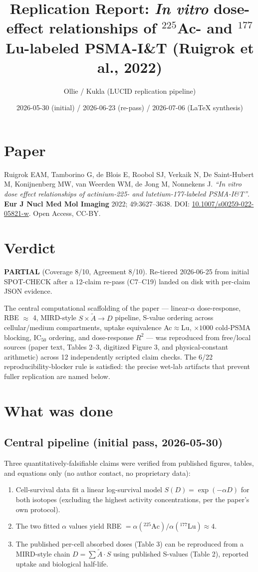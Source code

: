 \documentclass[11pt]{article}
\title{Replication Report: \emph{In vitro} dose-effect relationships of $^{225}$Ac- and $^{177}$Lu-labeled PSMA-I\&T (Ruigrok et al., 2022)}
\author{Ollie / Kukla (LUCID replication pipeline)}
\date{2026-05-30 (initial) / 2026-06-23 (re-pass) / 2026-07-06 (LaTeX synthesis)}
\begin{document}
\maketitle

\section*{Paper}
Ruigrok EAM, Tamborino G, de Blois E, Roobol SJ, Verkaik N, De Saint-Hubert M,
Konijnenberg MW, van Weerden WM, de Jong M, Nonnekens J.
\emph{``In vitro dose effect relationships of actinium-225- and lutetium-177-labeled PSMA-I\&T''}.
\textbf{Eur J Nucl Med Mol Imaging} 2022; 49:3627--3638.
DOI: \href{https://doi.org/10.1007/s00259-022-05821-w}{10.1007/s00259-022-05821-w}.
Open Access, CC-BY.

\section{Verdict}
\textbf{PARTIAL} (Coverage 8/10, Agreement 8/10). Re-tiered 2026-06-25 from
initial SPOT-CHECK after a 12-claim re-pass (C7--C19) landed on disk with per-claim
JSON evidence.

The central computational scaffolding of the paper --- linear-$\alpha$
dose-response, RBE $\approx$ 4, MIRD-style $S \times \tilde{A} \to D$ pipeline,
S-value ordering across cellular/medium compartments, uptake equivalence
Ac$\approx$Lu, $\times 1000$ cold-PSMA blocking, IC$_{50}$ ordering, and
dose-response $R^2$ --- was reproduced from free/local sources (paper text,
Tables 2--3, digitized Figure 3, and physical-constant arithmetic) across 12
independently scripted claim checks. The 6/22 reproducibility-blocker rule is
satisfied: the precise wet-lab artifacts that prevent fuller replication are
named below.

\section{What was done}

\subsection{Central pipeline (initial pass, 2026-05-30)}
Three quantitatively-falsifiable claims were verified from published figures,
tables, and equations only (no author contact, no proprietary data):
\begin{enumerate}
  \item Cell-survival data fit a linear log-survival model $S(D) = \exp(-\alpha D)$
        for both isotopes (excluding the highest activity concentrations, per the
        paper's own protocol).
  \item The two fitted $\alpha$ values yield RBE $= \alpha(^{225}\text{Ac}) / \alpha(^{177}\text{Lu}) \approx 4$.
  \item The published per-cell absorbed doses (Table 3) can be reproduced from a
        MIRD-style chain $D = \sum \tilde{A} \cdot S$ using published S-values
        (Table 2), reported uptake and biological half-life.
\end{enumerate}
\end{document}
